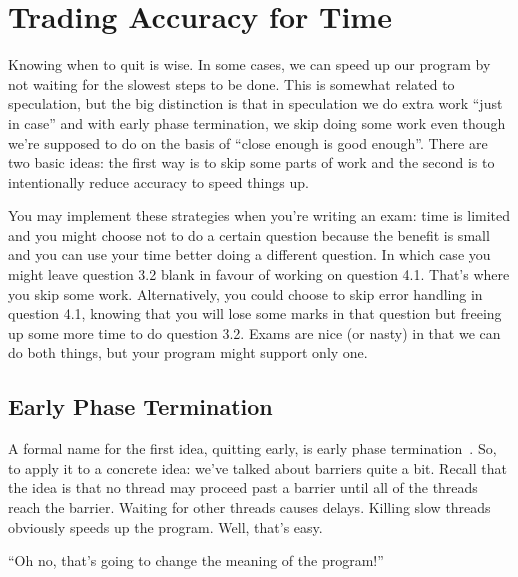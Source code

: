 




\section*{Trading Accuracy for Time}

Knowing when to quit is wise. In some cases, we can speed up our program by not waiting for the slowest steps to be done. This is somewhat related to speculation, but the big distinction is that in speculation we do extra work ``just in case'' and with early phase termination, we skip doing some work even though we're supposed to do on the basis of ``close enough is good enough''.  There are two basic ideas: the first way is to skip some parts of work and the second is to intentionally reduce accuracy to speed things up. 

You may implement these strategies when you're writing an exam: time is limited and you might choose not to do a certain question because the benefit is small and you can use your time better doing a different question. In which case you might leave question 3.2 blank in favour of working on question 4.1. That's where you skip some work. Alternatively, you could choose to skip error handling in question 4.1, knowing that you will lose some marks in that question but freeing up some more time to do question 3.2. Exams are nice (or nasty) in that we can do both things, but your program might support only one.

\subsection*{Early Phase Termination}

A formal name for the first idea, quitting early, is early phase
termination~\cite{Rinard:2007:EarlyPhaseTermination}. So, to apply it to a concrete idea: we've talked about barriers quite a bit. Recall that the idea is that
no thread may proceed past a barrier until all of the threads
reach the barrier. Waiting for other threads causes delays. 
Killing slow threads obviously speeds up the program. Well, that's easy.

\begin{center}
``Oh no, that's going to change the meaning of the program!''
\end{center}

